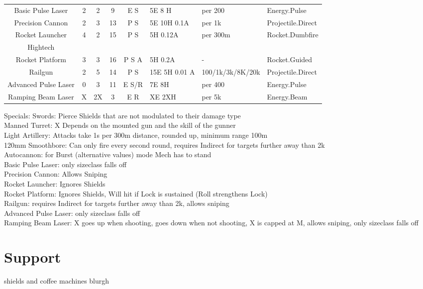 \begin{tabular}{c|cccclll}
    Basic Pulse Laser & 2 & 2 & 9 & E S & 5E 8 H & per 200 & Energy.Pulse\\
    Precision Cannon & 2 & 3 & 13 & P S & 5E 10H 0.1A & per 1k & Projectile.Direct\\
    Rocket Launcher & 4 & 2 & 15 & P S & 5H 0.12A &per 300m & Rocket.Dumbfire\\
    \hline Hightech &&&&&\\
    Rocket Platform & 3 & 3 & 16 & P S A & 5H 0.2A & - & Rocket.Guided \\
    Railgun & 2 &5& 14 & P S & 15E 5H 0.01 A& 100/1k/3k/8K/20k & Projectile.Direct\\
    Advanced Pulse Laser & 0 & 3 & 11 & E S/R & 7E 8H  &per 400 & Energy.Pulse \\
    Ramping Beam Laser & X & 2X & 3 & E R        & XE 2XH & per 5k & Energy.Beam \\
\end{tabular}\par
Specials:
Swords: Pierce Shields that are not modulated to their damage type\\
Manned Turret: X Depends on the mounted gun and the skill of the gunner\\
Light Artillery: Attacks take 1s per 300m distance, rounded up, minimum range 100m\\
120mm Smoothbore: Can only fire every second round, requires Indirect for targets further away than 2k\\
Autocannon: for Burst (alternative values) mode Mech has to stand\\
Basic Pulse Laser: only sizeclass falls off\\
Precision Cannon: Allows Sniping \\
Rocket Launcher: Ignores Shields \\
Rocket Platform: Ignores Shields, Will hit if Lock is sustained (Roll strengthens Lock)\\
Railgun: requires Indirect for targets further away than 2k, allows sniping\\
Advanced Pulse Laser: only sizeclass falls off\\
Ramping Beam Laser: X goes up when shooting, goes down when not shooting, X is capped at M, allows sniping,
        only sizeclass falls off\\
\section{Support}\label{sec:support}
shields and coffee machines blurgh


